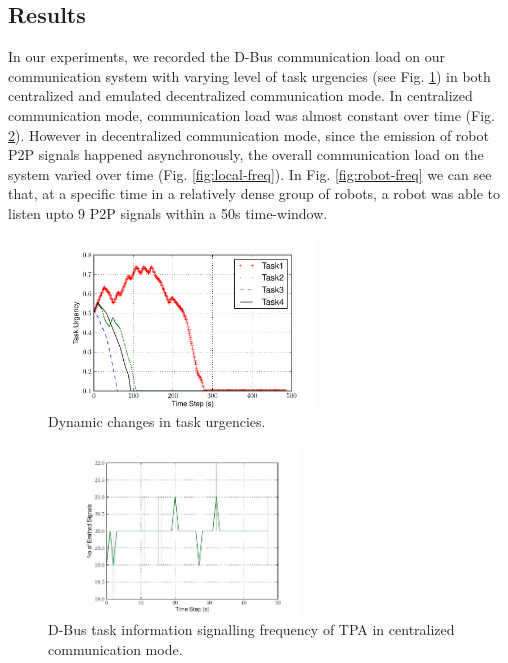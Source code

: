 \documentclass{ifacconf}
\begin{document}
\subsection{Results}
In our experiments, we recorded the D-Bus communication load on our communication system with varying level of task urgencies (see Fig. \ref{fig:task-urgency}) in both centralized and emulated decentralized communication mode. In  centralized communication mode, communication load was almost constant over time (Fig. \ref{fig:global-freq}).  However in decentralized communication mode, since the emission of robot P2P signals happened asynchronously, the overall communication load on the system varied over time (Fig. \ref{fig:local-freq}). In Fig. \ref{fig:robot-freq} we can see that, at a specific time in a relatively dense group of robots, a robot was able to listen upto 9 P2P signals within a 50s time-window.
\begin{figure}
\centering
\includegraphics[width=7.5cm,height=4.5cm]{./images/PlotUrgencyLog-2010Feb15-171017}    %
\caption{Dynamic changes in task urgencies.} 
\label{fig:task-urgency}
\end{figure}
\begin{figure}
\begin{center}
\includegraphics[width=7.5cm,height=4.5cm]{./images/Global-SignalingFreqStat}    %
\caption{D-Bus task information signalling frequency of TPA in centralized communication mode.} 
\label{fig:global-freq}
\end{center}
\end{figure}
\end{document}
